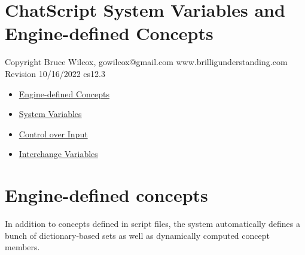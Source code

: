 \documentclass[]{article}
\date{}
\providecommand{\tightlist}{%
  \setlength{\itemsep}{0pt}\setlength{\parskip}{0pt}}
\begin{document}
\section{ChatScript System Variables and Engine-defined
Concepts}\label{chatscript-system-variables-and-engine-defined-concepts}

Copyright Bruce Wilcox, gowilcox@gmail.com www.brilligunderstanding.com
Revision 10/16/2022 cs12.3

\begin{itemize}
\tightlist
\item
  \href{ChatScript-System-Variables-and-Engine-defined-Concepts.md\#engine-defined-concepts}{Engine-defined
  Concepts}
\item
  \href{ChatScript-System-Variables-and-Engine-defined-Concepts.md\#system-variables}{System
  Variables}
\item
  \href{ChatScript-System-Variables-and-Engine-defined-Concepts.md\#control-over-input}{Control
  over Input}
\item
  \href{ChatScript-System-Variables-and-Engine-defined-Concepts.md\#interchange-variables}{Interchange
  Variables}
\end{itemize}

\section{Engine-defined concepts}\label{engine-defined-concepts}

In addition to concepts defined in script files, the system
automatically defines a bunch of dictionary-based sets as well as
dynamically computed concept members.
\end{document}
